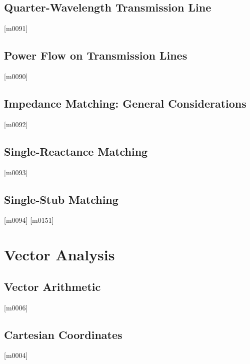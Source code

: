 \documentclass[10pt,letterpaper,twocolumn,openany]{book}
\theoremstyle{definition} %
\begin{document}
    \section{Quarter-Wavelength Transmission Line}
{\color{blue}\tiny[m0091]}      
      \vfill\break
    \section{Power Flow on Transmission Lines}
{\color{blue}\tiny[m0090]}      
      \vfill\break
    \section{Impedance Matching: General Considerations}
{\color{blue}\tiny[m0092]}      
      \vfill\break
    \section{Single-Reactance Matching}
{\color{blue}\tiny[m0093]}      
      \vfill\break
    \section{Single-Stub Matching}
{\color{blue}\tiny[m0094]}      
      \vfill\break
{\color{blue}\tiny[m0151]}    
  \chapter{Vector Analysis}
  \thispagestyle{fancy} %
  \fancyhf{}            %
    \section{Vector Arithmetic}
{\color{blue}\tiny[m0006]}      
      \vfill\break
    \section{Cartesian Coordinates}
{\color{blue}\tiny[m0004]}      
      \vfill\break
\end{document}
